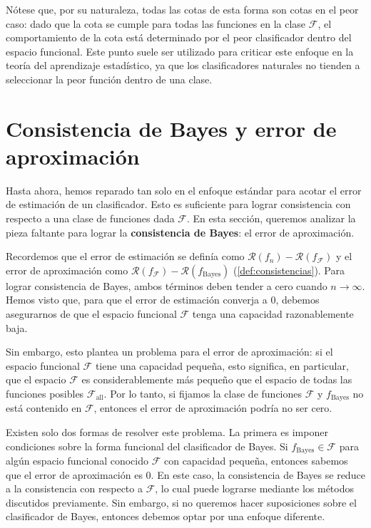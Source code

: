 \documentclass{report}
\begin{document}
Nótese que, por su naturaleza, todas las cotas de esta forma son cotas en el peor caso: dado que
la cota se cumple para todas las funciones en la clase \(\mathcal{F}\), el comportamiento de la cota
está determinado por el peor clasificador dentro del espacio funcional. Este punto suele ser
utilizado para criticar este enfoque en la teoría del aprendizaje estadístico, ya que los clasificadores
naturales no tienden a seleccionar la peor función dentro de una clase.


\section{Consistencia de Bayes y error de aproximación}

Hasta ahora, hemos reparado tan solo en el enfoque estándar para acotar el error de estimación
de un clasificador. Esto es suficiente para lograr consistencia con respecto a una clase de funciones
dada \(\mathcal{F}\). En esta sección, queremos analizar la pieza faltante para lograr la
\textbf{consistencia de Bayes}: el error de aproximación.

Recordemos que el error de estimación se definía como \(\mathcal{R}(f_n) - \mathcal{R}(f_{\mathcal{F}})\)
y el error de aproximación como \(\mathcal{R}(f_{\mathcal{F}}) - \mathcal{R}(f_{\text{Bayes}})\)
(\ref{def:consistencias}). Para lograr consistencia de Bayes, ambos términos deben tender a cero cuando
\(n \to \infty\). Hemos visto que, para que el error de estimación converja a \(0\), debemos
asegurarnos de que el espacio funcional \(\mathcal{F}\) tenga una capacidad razonablemente baja.

Sin embargo, esto plantea un problema para el error de aproximación: si el espacio funcional
\(\mathcal{F}\) tiene una capacidad pequeña, esto significa, en particular, que el espacio
\(\mathcal{F}\) es considerablemente más pequeño que el espacio de todas las funciones posibles
\(\mathcal{F}_{\text{all}}\). Por lo tanto, si fijamos la clase de funciones \(\mathcal{F}\) y
\(f_{\text{Bayes}}\) no está contenido en \(\mathcal{F}\), entonces el
error de aproximación podría no ser cero.

Existen solo dos formas de resolver este problema. La primera es imponer condiciones sobre la
forma funcional del clasificador de Bayes. Si \(f_{\text{Bayes}} \in \mathcal{F}\) para algún
espacio funcional conocido \(\mathcal{F}\) con capacidad pequeña, entonces sabemos que el error
de aproximación es \(0\). En este caso, la consistencia de Bayes se reduce a la consistencia con
respecto a \(\mathcal{F}\), lo cual puede lograrse mediante los métodos discutidos previamente.
Sin embargo, si no queremos hacer suposiciones sobre el clasificador de Bayes, entonces
debemos optar por una enfoque diferente.
\end{document}
